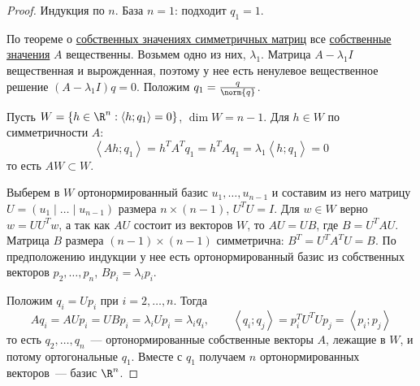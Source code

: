 \begin{proof}
  Индукция по $n$. База $n = 1$: подходит $q_1 = 1$.

  По теореме о \hyperref[note:4F4E5575-ABE6-4D9B-9C61-B76A3AA9701C]{собственных значениях симметричных матриц} все \hyperref[note:9D2905FC-8E68-4E6F-9243-364269F795B0]{собственные значения} $A$ вещественны. Возьмем одно из них, $\lambda_1$.
  Матрица $A - \lambda_1 I$ вещественная и вырожденная, поэтому у нее есть ненулевое вещественное решение $(A - \lambda_1 I) q = 0$. Положим $q_1 = \frac{q}{\norm{q}}$.

  Пусть $W = \left\{ h \in \R^n : \left\langle h; q_1 \right\rangle = 0 \right\}$, $\dim W = n - 1$. Для $h \in W$ по симметричности $A$:
  \[
  \left\langle Ah; q_1 \right\rangle = h^T A^T q_1 = h^T A q_1 = \lambda_1 \left\langle h; q_1 \right\rangle = 0
  \]
  то есть $A W \subset W$.

  Выберем в $W$ ортонормированный базис $u_1, \dots, u_{n-1}$ и составим из него матрицу $U = (u_1 \mid \dots \mid u_{n-1})$ размера $n \times (n-1)$, $U^T U = I$.
  Для $w \in W$ верно $w = U U^T w$, а так как $A U$ состоит из векторов $W$, то $A U = U B$, где $B = U^T A U$.
  Матрица $B$ размера $(n-1) \times (n-1)$ симметрична: $B^T = U^T A^T U = B$. По предположению индукции у нее есть ортонормированный базис из собственных векторов $p_2, \dots, p_n$, $B p_i = \lambda_i p_i$.

  Положим $q_i = U p_i$ при $i = 2, \dots, n$. Тогда
  \[
  A q_i = A U p_i = U B p_i = \lambda_i U p_i = \lambda_i q_i, \qquad \left\langle q_i; q_j \right\rangle = p_i^T U^T U p_j = \left\langle p_i; p_j \right\rangle
  \]
  то есть $q_2, \dots, q_n$~--- ортонормированные собственные векторы $A$, лежащие в $W$, и потому ортогональные $q_1$.
  Вместе с $q_1$ получаем $n$ ортонормированных векторов~--- базис $\R^n$.
\end{proof}
